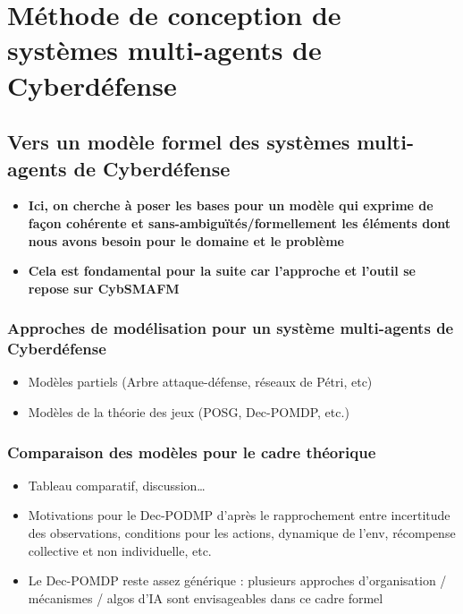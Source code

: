 \chapter{Méthode de conception de systèmes multi-agents de Cyberdéfense}\label{ch:cybSMAdm} %

\section{Vers un modèle formel des systèmes multi-agents de Cyberdéfense}\label{sec:cybSMAfm}

\begin{itemize}
    \item \textbf{Ici, on cherche à poser les bases pour un modèle qui exprime de façon cohérente et sans-ambiguïtés/formellement les éléments dont nous avons besoin pour le domaine et le problème}
    \item \textbf{Cela est fondamental pour la suite car l'approche et l'outil se repose sur CybSMAFM}
\end{itemize}

\subsection{Approches de modélisation pour un système multi-agents de Cyberdéfense}
\begin{itemize}

    \item Modèles partiels (Arbre attaque-défense, réseaux de Pétri, etc)
    \item Modèles de la théorie des jeux (POSG, Dec-POMDP, etc.)
\end{itemize}

\subsection{Comparaison des modèles pour le cadre théorique}
\begin{itemize}

    \item Tableau comparatif, discussion…
    \item Motivations pour le Dec-PODMP d'après le rapprochement entre incertitude des observations, conditions pour les actions, dynamique de l'env, récompense collective et non individuelle, etc.
    \item Le Dec-POMDP reste assez générique : plusieurs approches d'organisation / mécanismes / algos d'IA sont envisageables dans ce cadre formel
\end{itemize}

